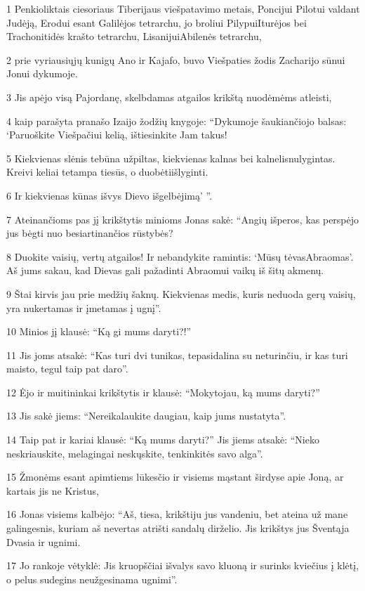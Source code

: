 \par 1 Penkioliktais ciesoriaus Tiberijaus viešpatavimo metais, Poncijui Pilotui valdant Judėją, Erodui esant Galilėjos tetrarchu, jo broliui Pilypui­Iturėjos bei Trachonitidės krašto tetrarchu, Lisanijui­Abilenės tetrarchu, 
\par 2 prie vyriausiųjų kunigų Ano ir Kajafo, buvo Viešpaties žodis Zacharijo sūnui Jonui dykumoje. 
\par 3 Jis apėjo visą Pajordanę, skelbdamas atgailos krikštą nuodėmėms atleisti, 
\par 4 kaip parašyta pranašo Izaijo žodžių knygoje: “Dykumoje šaukiančiojo balsas: ‘Paruoškite Viešpačiui kelią, ištiesinkite Jam takus! 
\par 5 Kiekvienas slėnis tebūna užpiltas, kiekvienas kalnas bei kalnelis­nulygintas. Kreivi keliai tetampa tiesūs, o duobėti­išlyginti. 
\par 6 Ir kiekvienas kūnas išvys Dievo išgelbėjimą’ ”. 
\par 7 Ateinančioms pas jį krikštytis minioms Jonas sakė: “Angių išperos, kas perspėjo jus bėgti nuo besiartinančios rūstybės? 
\par 8 Duokite vaisių, vertų atgailos! Ir nebandykite ramintis: ‘Mūsų tėvas­Abraomas’. Aš jums sakau, kad Dievas gali pažadinti Abraomui vaikų iš šitų akmenų. 
\par 9 Štai kirvis jau prie medžių šaknų. Kiekvienas medis, kuris neduoda gerų vaisių, yra nukertamas ir įmetamas į ugnį”. 
\par 10 Minios jį klausė: “Ką gi mums daryti?!” 
\par 11 Jis joms atsakė: “Kas turi dvi tunikas, tepasidalina su neturinčiu, ir kas turi maisto, tegul taip pat daro”. 
\par 12 Ėjo ir muitininkai krikštytis ir klausė: “Mokytojau, ką mums daryti?” 
\par 13 Jis sakė jiems: “Nereikalaukite daugiau, kaip jums nustatyta”. 
\par 14 Taip pat ir kariai klausė: “Ką mums daryti?” Jis jiems atsakė: “Nieko neskriauskite, melagingai neskųskite, tenkinkitės savo alga”. 
\par 15 Žmonėms esant apimtiems lūkesčio ir visiems mąstant širdyse apie Joną, ar kartais jis ne Kristus, 
\par 16 Jonas visiems kalbėjo: “Aš, tiesa, krikštiju jus vandeniu, bet ateina už mane galingesnis, kuriam aš nevertas atrišti sandalų dirželio. Jis krikštys jus Šventąja Dvasia ir ugnimi. 
\par 17 Jo rankoje vėtyklė: Jis kruopščiai išvalys savo kluoną ir surinks kviečius į klėtį, o pelus sudegins neužgesinama ugnimi”. 
